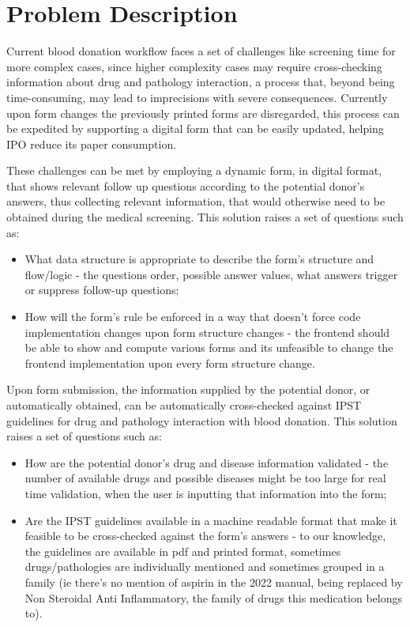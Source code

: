 %
%
\chapter{Problem Description} \label{cap:problem_description}

Current blood donation workflow faces a set of challenges like screening time for more complex cases, since higher complexity cases may require cross-checking information about drug and pathology interaction, a process that, beyond being time-consuming,  may lead to imprecisions with severe consequences. Currently upon form changes the previously printed forms are disregarded, this process can be expedited by supporting a digital form that can be easily updated, helping IPO reduce its paper consumption.

These challenges can be met by employing a dynamic form, in digital format, that shows relevant follow up questions according to the potential donor's answers, thus collecting relevant information, that would otherwise need to be obtained during the medical screening.
This solution raises a set of questions such as:
\begin{itemize}
	\item What data structure is appropriate to describe the form's structure and flow/logic - 
	the questions order, possible answer values, what answers trigger or suppress follow-up questions;
	\item How will the form's rule be enforced in a way that doesn't force code implementation changes upon form structure changes - the frontend should be able to show and compute various forms and its unfeasible to change the frontend implementation upon every form structure change.
\end{itemize}

Upon form submission, the information supplied by the potential donor, or automatically obtained, can be automatically cross-checked against IPST guidelines for drug and pathology interaction with blood donation.
This solution raises a set of questions such as:
\begin{itemize}
	\item How are the potential donor's drug and disease information validated - the number of available drugs and possible diseases might be too large for real time validation, when the user is inputting that information into the form;
	\item Are the IPST guidelines available in a machine readable format that make it feasible to be cross-checked against the form's answers - to our knowledge, the guidelines are available in pdf and printed format, sometimes drugs/pathologies are individually mentioned and sometimes grouped in a family (ie there's no mention of aspirin in the 2022 manual, being replaced by Non Steroidal Anti Inflammatory, the family of drugs this medication belongs to).
\end{itemize}

